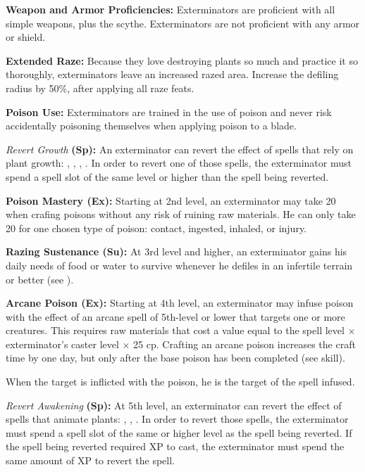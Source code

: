 {
\textbf{Weapon and Armor Proficiencies:} Exterminators are proficient with all simple  weapons, plus the scythe. Exterminators are not proficient with any armor or shield.

\textbf{Extended Raze:} Because they love destroying plants so much and practice it so thoroughly, exterminators leave an increased razed area. Increase the defiling radius by 50\%, after applying all raze feats.

\textbf{Poison Use:} Exterminators are trained in the use of poison and never risk accidentally poisoning themselves when applying poison to a blade.

\textit{Revert Growth} \textbf{(Sp):} An exterminator can revert the effect of spells that rely on plant growth: , , , . In order to revert one of those spells, the exterminator must spend a spell slot of the same level or higher than the spell being reverted.

\textbf{Poison Mastery (Ex):} Starting at 2nd level, an exterminator may take 20 when crafing poisons without any risk of ruining raw materials. He can only take 20 for one chosen type of poison: contact, ingested, inhaled, or injury. 

\textbf{Razing Sustenance (Su):} At 3rd level and higher, an exterminator gains his daily needs of food or water to survive whenever he defiles in an infertile terrain or better (see ).

\textbf{Arcane Poison (Ex):} Starting at 4th level, an exterminator may infuse poison with the effect of an arcane spell of 5th-level or lower that targets one or more creatures. This requires raw materials that cost a value equal to the spell level $\times$ exterminator's caster level $\times$ 25 cp. Crafting an arcane poison increases the craft time by one day, but only after the base poison has been completed (see  skill).

When the target is inflicted with the poison, he is the target of the spell infused.

\textit{Revert Awakening} \textbf{(Sp):} At 5th level, an exterminator can revert the effect of spells that animate plants: , , . In order to revert those spells, the exterminator must spend a spell slot of the same or higher level as the spell being reverted. If the spell being reverted required XP to cast, the exterminator must spend the same amount of XP to revert the spell.
}